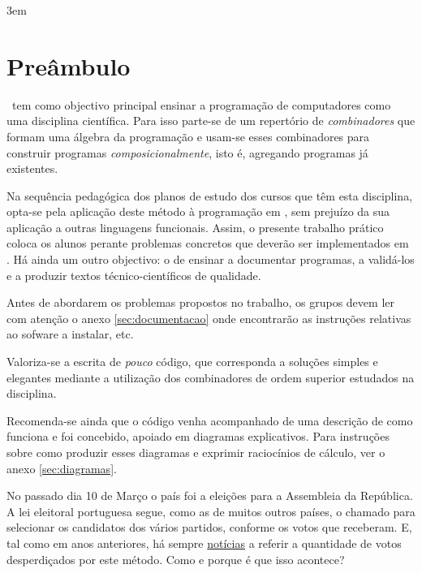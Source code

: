 \documentclass[11pt, a4paper, fleqn]{article}
\begin{document}
\sffamily
\setlength{\parindent}{0em}
\emergencystretch 3em
\renewcommand{\baselinestretch}{1.25} 

\pagestyle{pagestyle}

\setlength{\parindent}{1em}

\section*{Preâmbulo}

\CP\ tem como objectivo principal ensinar a progra\-mação de computadores
como uma disciplina científica. Para isso parte-se de um repertório de \emph{combinadores}
que formam uma álgebra da programação %
e usam-se esses combinadores para construir programas \emph{composicionalmente},
isto é, agregando programas já existentes.

Na sequência pedagógica dos planos de estudo dos cursos que têm
esta disciplina, opta-se pela aplicação deste método à programação
em \Haskell, sem prejuízo da sua aplicação a outras linguagens
funcionais. Assim, o presente trabalho prático coloca os
alunos perante problemas concretos que deverão ser implementados em
\Haskell. Há ainda um outro objectivo: o de ensinar a documentar
programas, a validá-los e a produzir textos técnico-científicos de
qualidade.

Antes de abordarem os problemas propostos no trabalho, os grupos devem ler
com atenção o anexo \ref{sec:documentacao} onde encontrarão as instruções
relativas ao sofware a instalar, etc.

\begin{alert}
Valoriza-se a escrita de \emph{pouco} código, que corresponda a soluções
simples e elegantes mediante a utilização dos combinadores de ordem superior
estudados na disciplina.

Recomenda-se ainda que o código venha acompanhado de uma descrição de como
funciona e foi concebido, apoiado em diagramas explicativos. Para instruções
sobre como produzir esses diagramas e exprimir raciocínios de cálculo, ver
o anexo \ref{sec:diagramas}.
\end{alert}


\Problema

No passado dia 10 de Março o país foi a eleições para a Assembleia da República.
A lei eleitoral portuguesa segue, como as de muitos outros países, o chamado
 para selecionar os candidatos dos vários partidos, conforme
os votos que receberam. E, tal como em anos anteriores, há sempre 
\href{https://www.jn.pt/6761243323/mais-de-673-mil-votos-desperdicados-nas-legislativas}{notícias}
a referir a quantidade de votos desperdiçados por este método.
Como e porque é que isso acontece?
\end{document}
